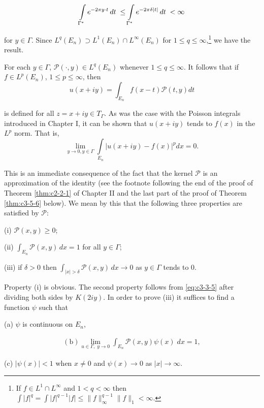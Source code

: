 \[
\intop_{\Gamma^{*}}e^{-2\pi y\cdot t}\,dt\;\leq\intop_{\Gamma^{*}}e^{-2\pi\delta|t|}\,dt\;<\infty
\]

for $y \in \Gamma$. Since $L^q(E_n) \supset L^1(E_n) \cap L^\infty(E_n)$ for $1 \leq q \leq \infty$,\footnote{If $f \in L^1 \cap L^\infty$ and $1 < q < \infty$ then $\int |f|^q = \int |f|^{q-1}|f| \leq \|f\|_\infty^{q-1}\|f\|_1 < \infty$.} we have the result.

\begin{corollary}
\label{cor:c3-3-7}
For each $y \in \Gamma$, $\mathcal{P}(\cdot, y) \in L^q(E_n)$ whenever $1 \leq q \leq \infty$. It follows that if $f \in L^p(E_n)$, $1 \leq p \leq \infty$, then
\[
u(x+i y)=\int_{E_{n}}f(x-t)\mathcal{P}(t,y)d t
\]

is defined for all $z = x + iy \in T_{\Gamma}$. As was the case with the Poisson integrals introduced in Chapter I, it can be shown that $u(x + iy)$ tends to $f(x)$ in the $L^{p}$ norm. That is,
\begin{equation}\label{eq:c3-3-8}
\lim_{y\to0,y\in\Gamma}\int\limits_{E_{n}}|u(x+iy)-f(x)|^{p} dx=0.
\end{equation}

\end{corollary}

This is an immediate consequence of the fact that the kernel $\mathcal{P}$ is an approximation of the identity (see the footnote following the end of the proof of Theorem \ref{thm:c2-2-1} of Chapter II and the last part of the proof of Theorem \ref{thm:c3-5-6} below). We mean by this that the following three properties are satisfied by $\mathcal{P}$:

(i) $\mathcal{P}(x, y) \geq 0$;

(ii) $\int_{E_n} \mathcal{P}(x, y) \, dx = 1$ for all $y \in \Gamma$;

(iii) if $\delta > 0$ then $\int_{|x| > \delta} \mathcal{P}(x, y) \, dx \to 0$ as $y \in \Gamma$ tends to 0.

Property (i) is obvious. The second property follows from \eqref{eq:c3-3-5} after dividing both sides by $K(2iy)$. In order to prove (iii) it suffices to find a function $\psi$ such that

(a) $\psi$ is continuous on $E_{n}$,

\[
\begin{array}{r}{\mathrm{(b)}\lim_{u\in\Gamma,\;y\rightarrow0}\int_{E_{n}}\mathcal{P}(x,y)\psi(x)\;d x=1,}\end{array}
\]

(c) $|\psi(x)| < 1$ when $x \neq 0$ and $\psi(x) \to 0$ as $|x| \to \infty$.

